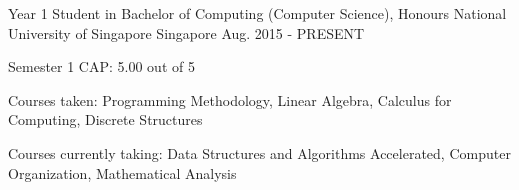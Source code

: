 

\begin{cventries}

  \cventry
    {Year 1 Student in Bachelor of Computing (Computer Science), Honours} %
    {National University of Singapore} %
    {Singapore} %
    {Aug. 2015 - PRESENT} %
    {
      \begin{cvitems} %
        \item {Semester 1 CAP: 5.00 out of 5}
        \item {Courses taken: Programming Methodology, Linear Algebra, Calculus for Computing, Discrete Structures}
        \item {Courses currently taking: Data Structures and Algorithms Accelerated, Computer Organization, Mathematical Analysis}
      \end{cvitems}
    }

\end{cventries}
